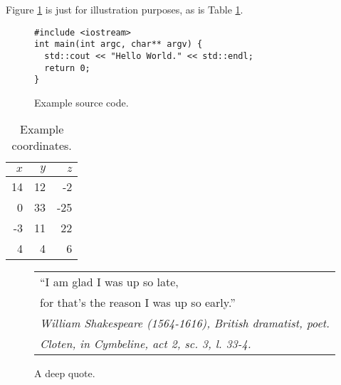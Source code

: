 
Figure \ref{fig:sourcecode} is just for illustration purposes, as is Table
\ref{tab:coordinates}.


\begin{figure}
\begin{verbatim}
#include <iostream>
int main(int argc, char** argv) {
  std::cout << "Hello World." << std::endl;
  return 0;
}
\end{verbatim}
  \caption{Example source code.}
  \label{fig:sourcecode}
\end{figure}


\begin{table}
  \centering
  \begin{tabular}{|rr|r|}
    \hline
    $x$ & $y$ & $z$ \\
    \hline
    14 & 12 & -2 \\
    0 & 33 & -25 \\
    -3 & 11 & 22 \\
    4 & 4 & 6 \\
    \hline
  \end{tabular}
  \caption{Example coordinates.}
  \label{tab:coordinates}
\end{table}



\begin{figure}
  \centering
  \begin{tabular}{l}
    ``I am glad I was up so late,\\
    \quad{}for that's the reason I was up so early.''\\
    \em \footnotesize William Shakespeare (1564-1616), British
    dramatist, poet.\\
    \em \footnotesize Cloten, in Cymbeline, act 2, sc. 3, l. 33-4.
  \end{tabular}
  \caption{A deep quote.}
  \label{fig:quote}
\end{figure}




